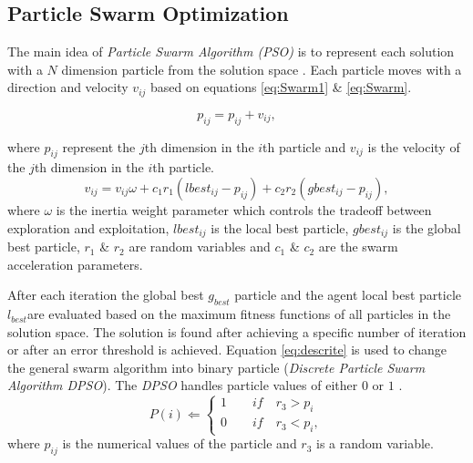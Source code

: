 \documentclass[a4paper,twoside]{article}
\begin{document}
\subsection{Particle Swarm Optimization}
\label{sec:ParticleSwarmAlgorithm}
 The main idea of \textit{Particle Swarm Algorithm (PSO)} is to represent each solution with a $N$ dimension particle from the solution space \cite{PSOFirst}. Each particle moves with a direction and velocity $v_{ij}$ based on equations \ref{eq:Swarm1} \& \ref{eq:Swarm}.

\begin{equation}
p_{ij}=p_{ij}+v_{ij},
\label{eq:Swarm1}
\end{equation}

where $p_{ij}$ represent the $j$th dimension in the $i$th particle and $v_{ij}$ is the velocity of the $j$th dimension in the $i$th particle.
 \begin{equation}
v_{ij}  = v_{ij} \omega + c_1 r_1 (lbest_{ij}  - p_{ij} ) + c_2 r_2 (gbest_{ij}  - p_{ij} ),
\label{eq:Swarm}
\end{equation}
 where $\omega$ is the inertia weight parameter which controls the tradeoff between exploration and exploitation,  $lbest_{ij}$ is the local best particle, $gbest_{ij}$ is the global best particle, $r_1$ \& $r_2$ are random variables and $c_1$ \& $c_2$ are the swarm acceleration parameters.

 After each iteration the global best $g_{best}$ particle and the agent local best particle $l_{best}$are evaluated based on the maximum fitness functions of all particles in the solution space. The solution is found after achieving a specific number of iteration or after an error threshold is achieved.
Equation \ref{eq:descrite} is used to change the general swarm algorithm into binary particle (\textit{Discrete Particle Swarm Algorithm DPSO}). The \textit{DPSO} handles particle values of either $0$ or $1$ \cite{PSODisceret}.
\begin{equation}
   P(i)\Leftarrow
\left \{
\begin{array}{c}
1 \quad \quad if\quad r_{3}>p_{i}  \\

0 \quad \quad if\quad r_{3}<p_{i},
\label{eq:descrite}
\end{array}\right.
\end{equation}
 where $p_{ij}$ is the numerical values of the particle and $r_{3}$ is a random variable.
\end{document}
